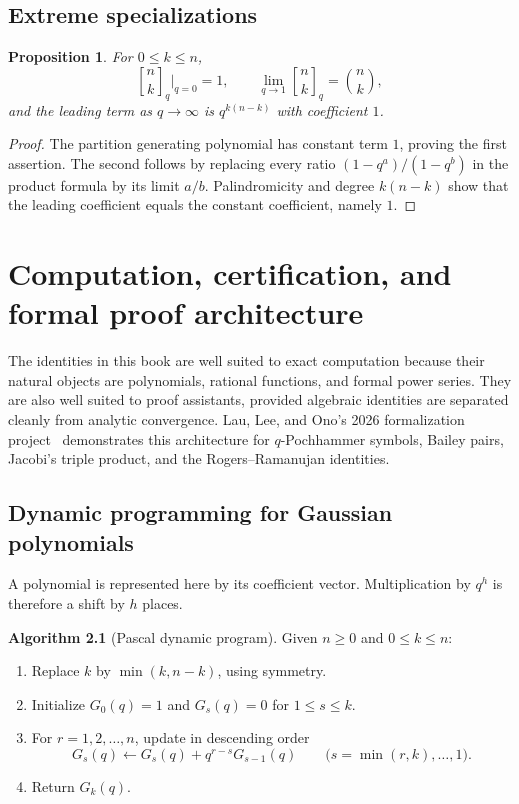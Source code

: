 \documentclass[11pt,oneside,openany]{book}
\newtheorem{proposition}[proposition]{Proposition}
\theoremstyle{definition}
\newtheorem{algorithm}[algorithm]{Algorithm}
\theoremstyle{remark}
\newcommand{\qbinom}[2]{\genfrac{[}{]}{0pt}{}{#1}{#2}_{q}}
\begin{document}
\section{Extreme specializations}

\begin{proposition}\label{prop:extreme-specializations}
For $0\le k\le n$,
\[
 \qbinom nk\bigg|_{q=0}=1,
 \qquad
 \lim_{q\to1}\qbinom nk=\binom nk,
\]
and the leading term as $q\to\infty$ is $q^{k(n-k)}$ with coefficient $1$.
\end{proposition}

\begin{proof}
The partition generating polynomial has constant term $1$, proving the first assertion.  The second follows by replacing every ratio $(1-q^a)/(1-q^b)$ in the product formula by its limit $a/b$.  Palindromicity and degree $k(n-k)$ show that the leading coefficient equals the constant coefficient, namely $1$.
\end{proof}

\chapter{Computation, certification, and formal proof architecture}\label{chap:formalization}

The identities in this book are well suited to exact computation because their natural objects are polynomials, rational functions, and formal power series.  They are also well suited to proof assistants, provided algebraic identities are separated cleanly from analytic convergence.  Lau, Lee, and Ono's 2026 formalization project~\cite{LauLeeOno2026} demonstrates this architecture for $q$-Pochhammer symbols, Bailey pairs, Jacobi's triple product, and the Rogers--Ramanujan identities.

\section{Dynamic programming for Gaussian polynomials}

A polynomial is represented here by its coefficient vector.  Multiplication by $q^h$ is therefore a shift by $h$ places.

\begin{algorithm}[Pascal dynamic program]\label{alg:gaussian-dp}
Given $n\ge0$ and $0\le k\le n$:
\begin{enumerate}
\item Replace $k$ by $\min(k,n-k)$, using symmetry.
\item Initialize $G_0(q)=1$ and $G_s(q)=0$ for $1\le s\le k$.
\item For $r=1,2,\ldots,n$, update in descending order
\[
 G_s(q)\leftarrow G_s(q)+q^{r-s}G_{s-1}(q)
 \qquad
 \bigl(s=\min(r,k),\ldots,1\bigr).
\]
\item Return $G_k(q)$.
\end{enumerate}
\end{algorithm}
\end{document}

